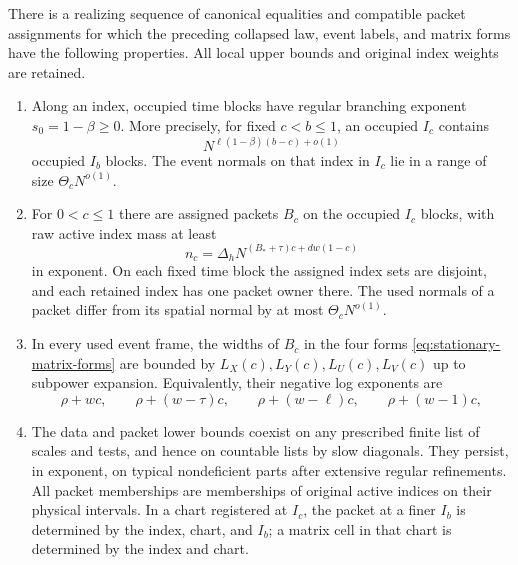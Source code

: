 \begin{proposition}
\label{prop:stationary-data}
There is a realizing sequence of canonical equalities and compatible
packet assignments for which the preceding collapsed law, event labels,
and matrix forms have the following properties. All local upper bounds
and original index weights are retained.
\begin{enumerate}[label=\textup{(\roman*)}]
\item
Along an index, occupied time blocks have regular branching exponent
$s_0=1-\beta\ge0$. More precisely, for fixed $c<b\le1$, an occupied
$I_c$ contains
\begin{equation}
 N^{\ell(1-\beta)(b-c)+o(1)}
 \label{eq:stationary-time-branching}
\end{equation}
occupied $I_b$ blocks. The event normals on that index in $I_c$ lie in a
range of size $\Theta_cN^{o(1)}$.

\item
For $0<c\le1$ there are assigned packets $B_c$ on the occupied $I_c$
blocks, with raw active index mass at least
\begin{equation}
 n_c=\Delta_h
 N^{(B_*+\tau)c+dw(1-c)}
 \label{eq:stationary-packet-mass}
\end{equation}
in exponent. On each fixed time block the assigned index sets are
disjoint, and each retained index has one packet owner there. The used
normals of a packet differ from its spatial normal by at most
$\Theta_cN^{o(1)}$.

\item
In every used event frame, the widths of $B_c$ in the four forms
\eqref{eq:stationary-matrix-forms} are bounded by
$L_X(c),L_Y(c),L_U(c),L_V(c)$ up to subpower expansion. Equivalently,
their negative log exponents are
\begin{equation}
 \rho+wc,\qquad \rho+(w-\tau)c,
 \qquad\rho+(w-\ell)c,\qquad\rho+(w-1)c,
 \label{eq:stationary-matrix-widths}
\end{equation}

\item
The data and packet lower bounds coexist on any prescribed finite list
of scales and tests, and hence on countable lists by slow diagonals. They
persist, in exponent, on typical nondeficient parts after extensive
regular refinements. All packet memberships are memberships of original
active indices on their physical intervals. In a chart registered at
$I_c$, the packet at a finer $I_b$ is determined by the index, chart, and
$I_b$; a matrix cell in that chart is determined by the index and chart.
\end{enumerate}
\end{proposition}

